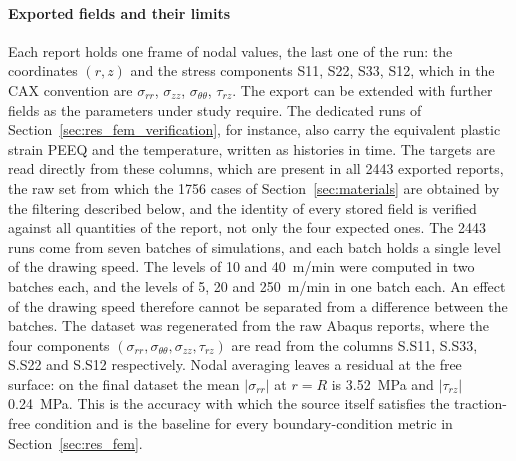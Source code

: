 \paragraph{Exported fields and their limits}
Each report holds one frame of nodal values, the last one of the run: the coordinates $(r,z)$ and the stress components S11, S22, S33, S12, which in the CAX convention are $\sigma_{rr}$, $\sigma_{zz}$, $\sigma_{\theta\theta}$, $\tau_{rz}$. The export can be extended with further fields as the parameters under study require. The dedicated runs of Section~\ref{sec:res_fem_verification}, for instance, also carry the equivalent plastic strain PEEQ and the temperature, written as histories in time. %
The targets are read directly from these columns, which are present in all 2443 exported reports, the raw set from which the 1756 cases of Section~\ref{sec:materials} are obtained by the filtering described below, and the identity of every stored field is verified against all quantities of the report, not only the four expected ones. %
The 2443 runs come from seven batches of simulations, and each batch holds a single level of the drawing speed. The levels of 10 and 40~m/min were computed in two batches each, and the levels of 5, 20 and 250~m/min in one batch each. An effect of the drawing speed therefore cannot be separated from a difference between the batches. %
The dataset was regenerated from the raw Abaqus reports, where the four components $(\sigma_{rr}, \sigma_{\theta\theta}, \sigma_{zz}, \tau_{rz})$ are read from the columns S.S11, S.S33, S.S22 and S.S12 respectively. %
Nodal averaging leaves a residual at the free surface: on the final dataset the mean $|\sigma_{rr}|$ at $r=R$ is 3.52~MPa and $|\tau_{rz}|$ 0.24~MPa. %
This is the accuracy with which the source itself satisfies the traction-free condition and is the baseline for every boundary-condition metric in Section~\ref{sec:res_fem}. %
